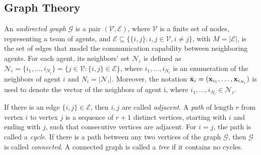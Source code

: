 \subsection{Graph Theory}
An \textit{undirected graph} $\mathcal{G}$ is a pair
$(\mathcal{V}, \mathcal{E})$, where $\mathcal{V}$ is a finite set of nodes,
representing a team of agents, and
$\mathcal{E} \subseteq \big\{ \{i,j\} : i,j \in \mathcal{V}, i \neq j \big\}$,
with $M = |\mathcal{E}|$, is the set of edges that model the communication
capability between neighboring agents. For each agent, its neighbors' set
$\mathcal{N}_i$ is defined as
$\mathcal{N}_i = \{i_1, \ldots, i_{N_i}\} = \big\{ j \in \mathcal{V} : \{i,j\} \in \mathcal{E}\big\}$,
where $i_1, \ldots, i_{N_i}$ is an enumeration of the neighbors of agent $i$
and $N_i = |\mathcal N_i|$.
Moreover, the notation
$\bar{\bm{\mathbf{x}}}_i = (\bm{\mathbf{x}}_{i_1}, \dots, \bm{\mathbf{x}}_{i_{N_i}})$
is used to denote the vector of the neighbors of agent i, where
$i_1, \dots, i_{N_i} \in \mathcal{N}_i$.

If there is an edge $\{i, j\} \in \mathcal{E}$, then $i, j$ are called
\textit{adjacent}. A \textit{path} of length $r$ from vertex $i$ to vertex
$j$ is a sequence of $r+1$ distinct vertices, starting with $i$ and ending
with $j$, such that consecutive vertices are adjacent. For $i = j$, the path
is called a \textit{cycle}. If there is a path between any two vertices of the
graph $\mathcal{G}$, then $\mathcal{G}$ is called \textit{connected}.
A connected graph is called a \textit{tree} if it contains no cycles.
